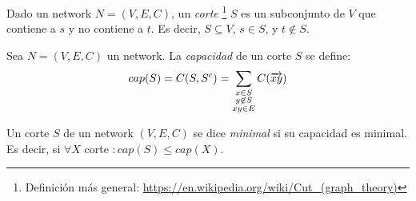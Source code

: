 \begin{definition}
  Dado un network $N = (V, E, C)$, un \emph{corte}
  \footnote{Definición más general: \url{https://en.wikipedia.org/wiki/Cut_(graph_theory)}}
  $S$ es un subconjunto de $V$
  que contiene a $s$ y no contiene a $t$. Es decir, $S \subseteq V$,
  $s \in S$, y $t \not\in S$.
\end{definition}

\begin{definition}
  Sea $N = (V, E, C)$ un network. La \emph{capacidad} de un corte $S$ se define:
  \begin{align}
    cap(S) = C(S, S^c) = \sum_{\substack{x\in S \\ y \not\in S \\ xy \in E}} C(\overrightarrow{xy})
  \end{align}
\end{definition}

\begin{definition}
  Un corte $S$ de un network $(V, E, C)$ se dice \emph{minimal} si su
  capacidad es minimal. Es decir, si
  $\forall X$ corte $ \colon cap(S) \le cap(X)$.
\end{definition}
